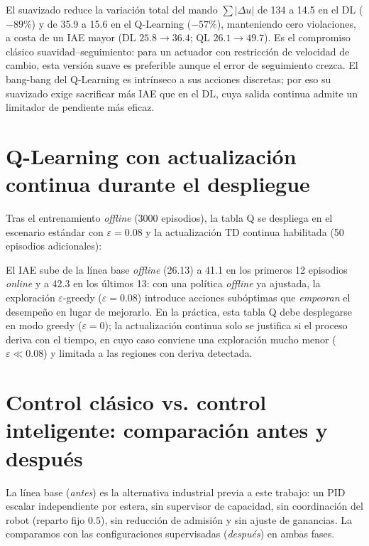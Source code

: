 El suavizado reduce la variación total del mando $\sum|\Delta u|$ de 134 a 14.5 en el DL ($-89\%$) y de 35.9 a 15.6 en el Q-Learning ($-57\%$), manteniendo cero violaciones, a costa de un IAE mayor (DL $25.8\to36.4$; QL $26.1\to49.7$). Es el compromiso clásico suavidad--seguimiento: para un actuador con restricción de velocidad de cambio, esta versión suave es preferible aunque el error de seguimiento crezca. El bang-bang del Q-Learning es intrínseco a sus acciones discretas; por eso su suavizado exige sacrificar más IAE que en el DL, cuya salida continua admite un limitador de pendiente más eficaz.

\section{Q-Learning con actualización continua durante el despliegue}
\label{sec:ql_online}

Tras el entrenamiento \emph{offline} (3000 episodios), la tabla Q se despliega en el escenario estándar con $\varepsilon=0.08$ y la actualización TD continua habilitada (50 episodios adicionales):




El IAE sube de la línea base \emph{offline} (26.13) a 41.1 en los primeros 12 episodios \emph{online} y a 42.3 en los últimos 13: con una política \emph{offline} ya ajustada, la exploración $\varepsilon$-greedy ($\varepsilon=0.08$) introduce acciones subóptimas que \emph{empeoran} el desempeño en lugar de mejorarlo. En la práctica, esta tabla Q debe desplegarse en modo greedy ($\varepsilon=0$); la actualización continua solo se justifica si el proceso deriva con el tiempo, en cuyo caso conviene una exploración mucho menor ($\varepsilon\!\ll\!0.08$) y limitada a las regiones con deriva detectada.

\section{Control clásico vs. control inteligente: comparación antes y después}

La línea base (\emph{antes}) es la alternativa industrial previa a este trabajo: un PID escalar independiente por estera, sin supervisor de capacidad, sin coordinación del robot (reparto fijo $0.5$), sin reducción de admisión y sin ajuste de ganancias. La comparamos con las configuraciones supervisadas (\emph{después}) en ambas fases.

